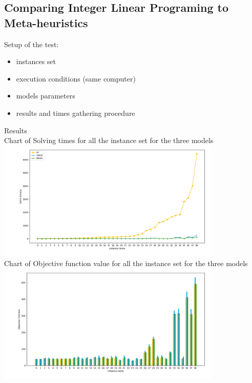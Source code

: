 \subsection{Comparing Integer Linear Programing to Meta-heuristics}


Setup of the test:\\
\begin{itemize}
	\item instances set
	\item execution conditions (same computer)
	\item models parameters
	\item results and times gathering procedure
\end{itemize}

Results\\
Chart of Solving times for all the instance set for the three models\\

\includegraphics[width=0.8\textwidth]{./img/ILPvsMetah_times_manual.png}\\[0.8cm] 


Chart of Objective function value for all the instance set for the three models\\


\includegraphics[width=0.8\textwidth]{./img/ILPvsMetah_objf_hist_manual.png}\\[0.8cm] 




\pagebreak